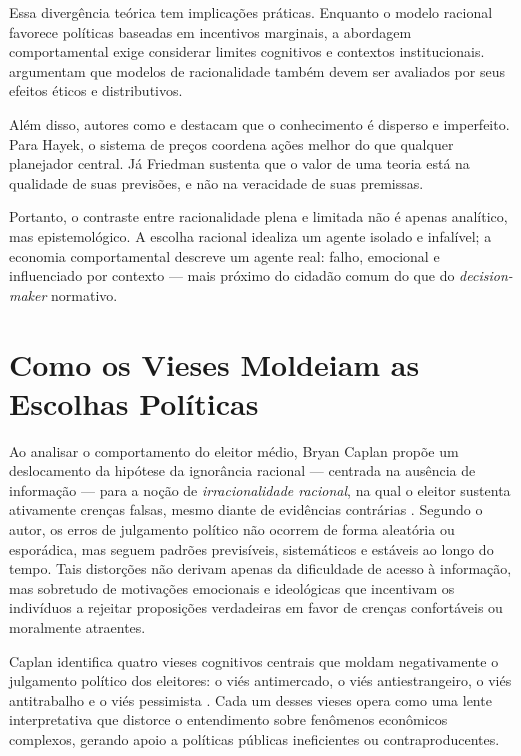 Essa divergência teórica tem implicações práticas. Enquanto o modelo racional favorece políticas baseadas em incentivos marginais, a abordagem comportamental exige considerar limites cognitivos e contextos institucionais.  argumentam que modelos de racionalidade também devem ser avaliados por seus efeitos éticos e distributivos.

Além disso, autores como  e  destacam que o conhecimento é disperso e imperfeito. Para Hayek, o sistema de preços coordena ações melhor do que qualquer planejador central. Já Friedman sustenta que o valor de uma teoria está na qualidade de suas previsões, e não na veracidade de suas premissas.

Portanto, o contraste entre racionalidade plena e limitada não é apenas analítico, mas epistemológico. A escolha racional idealiza um agente isolado e infalível; a economia comportamental descreve um agente real: falho, emocional e influenciado por contexto — mais próximo do cidadão comum do que do \textit{decision-maker} normativo.

\section{Como os Vieses Moldeiam as Escolhas Políticas} %


Ao analisar o comportamento do eleitor médio, Bryan Caplan propõe um deslocamento da hipótese da ignorância racional — centrada na ausência de informação — para a noção de \textit{irracionalidade racional}, na qual o eleitor sustenta ativamente crenças falsas, mesmo diante de evidências contrárias \cite{The_Myth_of_the_Rational_Voter}. Segundo o autor, os erros de julgamento político não ocorrem de forma aleatória ou esporádica, mas seguem padrões previsíveis, sistemáticos e estáveis ao longo do tempo. Tais distorções não derivam apenas da dificuldade de acesso à informação, mas sobretudo de motivações emocionais e ideológicas que incentivam os indivíduos a rejeitar proposições verdadeiras em favor de crenças confortáveis ou moralmente atraentes.

Caplan identifica quatro vieses cognitivos centrais que moldam negativamente o julgamento político dos eleitores: o viés antimercado, o viés antiestrangeiro, o viés antitrabalho e o viés pessimista \cite{Systematically_Biased_Beliefs_about_Economics}. Cada um desses vieses opera como uma lente interpretativa que distorce o entendimento sobre fenômenos econômicos complexos, gerando apoio a políticas públicas ineficientes ou contraproducentes.

